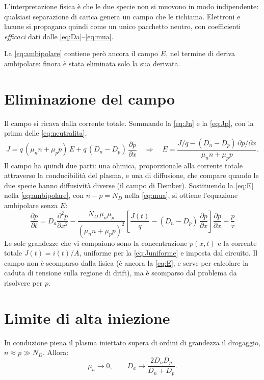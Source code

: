 \documentclass[11pt,a4paper]{article}
\newcommand{\dpar}[2]{\frac{\partial #1}{\partial #2}}
\newcommand{\dparq}[2]{\frac{\partial^2 #1}{\partial #2^2}}
\begin{document}
L'interpretazione fisica \`e che le due specie non si muovono in modo indipendente:
qualsiasi separazione di carica genera un campo che le richiama. Elettroni e lacune si
propagano quindi come un unico pacchetto neutro, con coefficienti \emph{efficaci} dati
dalle \eqref{eq:Da}--\eqref{eq:mua}.

La \eqref{eq:ambipolare} contiene per\`o ancora il campo $E$, nel termine di deriva
ambipolare: finora \`e stata eliminata solo la sua derivata.

\section{Eliminazione del campo}
\label{sec:elimE}

Il campo si ricava dalla corrente totale. Sommando la \eqref{eq:Jn} e la \eqref{eq:Jp},
con la prima delle \eqref{eq:neutralita},
\begin{equation}
  J = q\,(\mu_n n + \mu_p p)\,E + q\,(D_n - D_p)\,\dpar{p}{x}
  \quad\Longrightarrow\quad
  E = \frac{J/q - (D_n - D_p)\,\partial p/\partial x}{\mu_n n + \mu_p p} .
  \label{eq:E}
\end{equation}
Il campo ha quindi due parti: una ohmica, proporzionale alla corrente totale
attraverso la conducibilit\`a del plasma, e una di diffusione, che compare quando le due
specie hanno diffusivit\`a diverse (il campo di Dember). Sostituendo la \eqref{eq:E}
nella \eqref{eq:ambipolare}, con $n - p = N_D$ nella \eqref{eq:mua}, si ottiene
l'equazione ambipolare senza $E$:
\begin{equation}
  \boxed{\;
  \dpar{p}{t} = D_a \dparq{p}{x}
  - \frac{N_D\,\mu_n\mu_p}{(\mu_n n + \mu_p p)^2}
    \left[\frac{J(t)}{q} - (D_n - D_p)\,\dpar{p}{x}\right]\dpar{p}{x}
  - \frac{p}{\tau}
  \;}
  \label{eq:ambipolareJ}
\end{equation}
Le sole grandezze che vi compaiono sono la concentrazione $p(x,t)$ e la corrente
totale $J(t) = i(t)/A$, uniforme per la \eqref{eq:Juniforme} e imposta dal circuito.
Il campo non \`e scomparso dalla fisica (\`e ancora la \eqref{eq:E}, e serve per
calcolare la caduta di tensione sulla regione di drift), ma \`e scomparso dal problema
da risolvere per $p$.

\section{Limite di alta iniezione}

In conduzione piena il plasma iniettato supera di ordini di grandezza il drogaggio,
$n \approx p \gg N_D$. Allora:
\begin{equation}
  \mu_a \longrightarrow 0, \qquad
  D_a \longrightarrow \frac{2 D_n D_p}{D_n + D_p} .
\end{equation}
\end{document}
